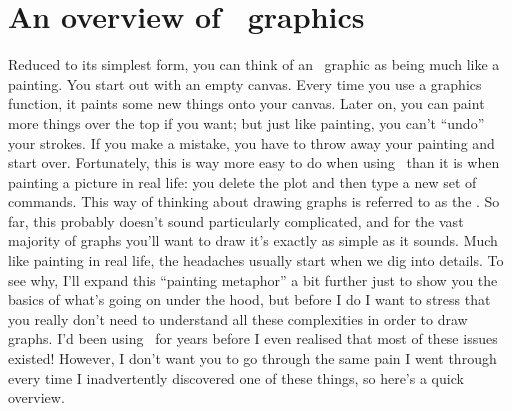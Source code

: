 \section{An overview of \R\ graphics\label{sec:rgraphics}}

Reduced to its simplest form, you can think of an \R\ graphic as being much like a painting. You start out with an empty canvas. Every time you use a graphics function, it paints some new things onto your canvas. Later on, you can paint more things over the top if you want; but just like painting, you can't ``undo'' your strokes. If you make a mistake, you have to throw away your painting and start over. Fortunately, this is way more easy to do when using \R\ than it is when painting a picture in real life: you delete the plot and then type a new set of commands. This way of thinking about drawing graphs is referred to as the . So far, this probably doesn't sound particularly complicated, and for the vast majority of graphs you'll want to draw it's exactly as simple as it sounds. Much like painting in real life, the headaches usually start when we dig into details. To see why, I'll  expand this ``painting metaphor'' a bit further just to show you the basics of what's going on under the hood, but before I do I want to stress that you really don't need to understand all these complexities in order to draw graphs. I'd been using \R\ for years before I even realised that most of these issues existed! However, I don't want you to go through the same pain I went through every time I inadvertently discovered one of these things, so here's a quick overview.

